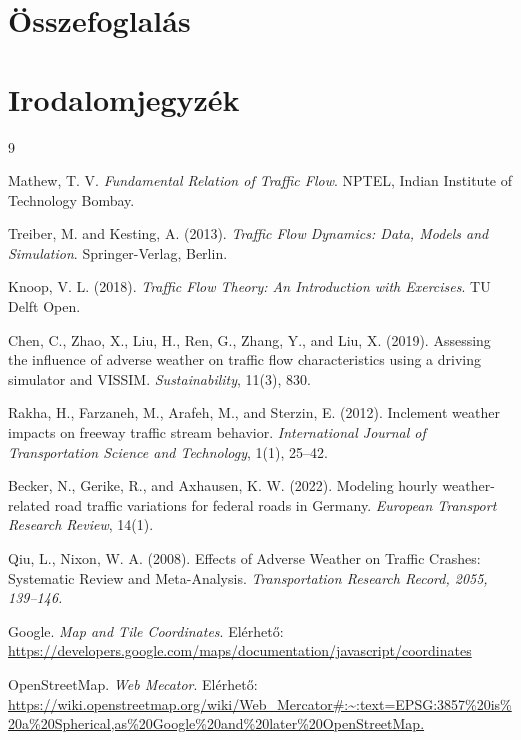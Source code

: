 \documentclass[14pt,a4paper]{extarticle}
\begin{document}
\section{Összefoglalás}

\section{Irodalomjegyzék}
\begin{thebibliography}{9}
	
	Mathew, T. V.  
	\textit{Fundamental Relation of Traffic Flow}.  
	NPTEL, Indian Institute of Technology Bombay.
	
	Treiber, M. and Kesting, A. (2013).  
	\textit{Traffic Flow Dynamics: Data, Models and Simulation}.  
	Springer-Verlag, Berlin.
	
	Knoop, V. L. (2018).  
	\textit{Traffic Flow Theory: An Introduction with Exercises}.  
	TU Delft Open.
	
	Chen, C., Zhao, X., Liu, H., Ren, G., Zhang, Y., and Liu, X. (2019).  
	Assessing the influence of adverse weather on traffic flow characteristics using a driving simulator and VISSIM.  
	\textit{Sustainability}, 11(3), 830.
	
	Rakha, H., Farzaneh, M., Arafeh, M., and Sterzin, E. (2012).  
	Inclement weather impacts on freeway traffic stream behavior.  
	\textit{International Journal of Transportation Science and Technology}, 1(1), 25--42.
	
	Becker, N., Gerike, R., and Axhausen, K. W. (2022).  
	Modeling hourly weather-related road traffic variations for federal roads in Germany.  
	\textit{European Transport Research Review}, 14(1).
	
	Qiu, L., Nixon, W. A. (2008).
	Effects of Adverse Weather on Traffic Crashes: Systematic Review and Meta-Analysis.
	\textit{Transportation Research Record, 2055, 139–146.}
    
    Google. \textit{Map and Tile Coordinates}.
    Elérhető:
    \\
    \url{https://developers.google.com/maps/documentation/javascript/coordinates}

    OpenStreetMap. \textit{Web Mecator}.
    Elérhető: 
    \\ \url{https://wiki.openstreetmap.org/wiki/Web_Mercator#:~:text=EPSG:3857%20is%20a%20Spherical,as%20Google%20and%20later%20OpenStreetMap.}
	
	
	
\end{thebibliography}
\end{document}
